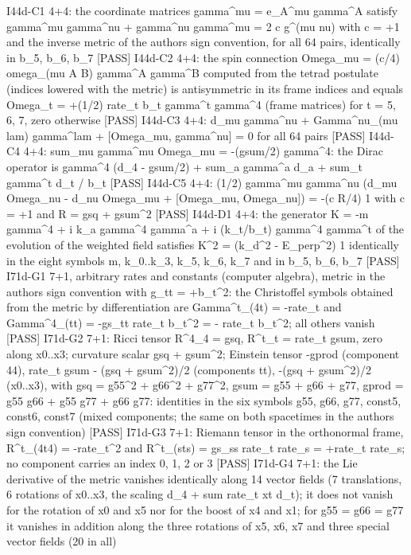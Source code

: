 \documentclass[
  10pt,
]{article}
\newenvironment{Shaded}{}{}
\newcommand{\NormalTok}[1]{#1}
\begin{document}
\begin{Shaded}
\begin{Highlighting}[]
\NormalTok{[PASS] I44d{-}C1  4+4: the coordinate matrices gamma\^{}mu = e\_A\^{}mu gamma\^{}A satisfy gamma\^{}mu gamma\^{}nu + gamma\^{}nu gamma\^{}mu = 2 c g\^{}(mu nu) with c = +1 and the inverse metric of the author\textquotesingle{}s sign convention, for all 64 pairs, identically in b\_5, b\_6, b\_7}
\NormalTok{[PASS] I44d{-}C2  4+4: the spin connection Omega\_mu = (c/4) omega\_(mu A B) gamma\^{}A gamma\^{}B computed from the tetrad postulate (indices lowered with the metric) is antisymmetric in its frame indices and equals Omega\_t = +(1/2) rate\_t b\_t gamma\^{}t gamma\^{}4 (frame matrices) for t = 5, 6, 7, zero otherwise}
\NormalTok{[PASS] I44d{-}C3  4+4: d\_mu gamma\^{}nu + Gamma\^{}nu\_(mu lam) gamma\^{}lam + [Omega\_mu, gamma\^{}nu] = 0 for all 64 pairs}
\NormalTok{[PASS] I44d{-}C4  4+4: sum\_mu gamma\^{}mu Omega\_mu = {-}(gsum/2) gamma\^{}4: the Dirac operator is gamma\^{}4 (d\_4 {-} gsum/2) + sum\_a gamma\^{}a d\_a + sum\_t gamma\^{}t d\_t / b\_t}
\NormalTok{[PASS] I44d{-}C5  4+4: (1/2) gamma\^{}mu gamma\^{}nu (d\_mu Omega\_nu {-} d\_nu Omega\_mu + [Omega\_mu, Omega\_nu]) = {-}(c R/4) 1 with c = +1 and R = gsq + gsum\^{}2}
\NormalTok{[PASS] I44d{-}D1  4+4: the generator K = {-}m gamma\^{}4 + i k\_a gamma\^{}4 gamma\^{}a + i (k\_t/b\_t) gamma\^{}4 gamma\^{}t of the evolution of the weighted field satisfies K\^{}2 = (k\_d\^{}2 {-} E\_perp\^{}2) 1 identically in the eight symbols m, k\_0..k\_3, k\_5, k\_6, k\_7 and in b\_5, b\_6, b\_7}
\NormalTok{[PASS] I71d{-}G1  7+1, arbitrary rates and constants (computer algebra), metric in the author\textquotesingle{}s sign convention with g\_tt = +b\_t\^{}2: the Christoffel symbols obtained from the metric by differentiation are Gamma\^{}t\_(4t) = {-}rate\_t and Gamma\^{}4\_(tt) = {-}gs\_tt rate\_t b\_t\^{}2 = {-} rate\_t b\_t\^{}2; all others vanish}
\NormalTok{[PASS] I71d{-}G2  7+1: Ricci tensor R\^{}4\_4 = gsq, R\^{}t\_t = rate\_t gsum, zero along x0..x3; curvature scalar gsq + gsum\^{}2; Einstein tensor {-}gprod (component 44), rate\_t gsum {-} (gsq + gsum\^{}2)/2 (components tt), {-}(gsq + gsum\^{}2)/2 (x0..x3), with gsq = g55\^{}2 + g66\^{}2 + g77\^{}2, gsum = g55 + g66 + g77, gprod = g55 g66 + g55 g77 + g66 g77: identities in the six symbols g55, g66, g77, const5, const6, const7 (mixed components; the same on both spacetimes in the author\textquotesingle{}s sign convention)}
\NormalTok{[PASS] I71d{-}G3  7+1: Riemann tensor in the orthonormal frame, R\^{}t\_(4t4) = {-}rate\_t\^{}2 and R\^{}t\_(sts) = gs\_ss rate\_t rate\_s = +rate\_t rate\_s; no component carries an index 0, 1, 2 or 3}
\NormalTok{[PASS] I71d{-}G4  7+1: the Lie derivative of the metric vanishes identically along 14 vector fields (7 translations, 6 rotations of x0..x3, the scaling d\_4 + sum rate\_t xt d\_t); it does not vanish for the rotation of x0 and x5 nor for the boost of x4 and x1; for g55 = g66 = g77 it vanishes in addition along the three rotations of x5, x6, x7 and three special vector fields (20 in all)}

\end{Highlighting}
\end{Shaded}
\end{document}
